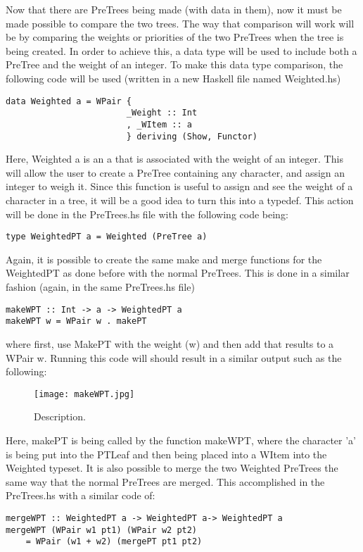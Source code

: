 \documentclass{article}
\begin{document}
Now that there are PreTrees being made (with data in them), now it must be made possible to compare the two trees.
The way that comparison will work will be by comparing the weights or priorities of the two PreTrees when the tree is being created.
In order to achieve this, a data type will be used to include both a PreTree and the weight of an integer.
To make this data type comparison, the following code will be used (written in a new Haskell file named Weighted.hs)
\begin{lstlisting}
data Weighted a = WPair {
                        _Weight :: Int
                        , _WItem :: a
                        } deriving (Show, Functor)
\end{lstlisting}
Here, Weighted a is an a that is associated with the weight of an integer.
This will allow the user to create a PreTree containing any character, and assign an integer to weigh it.
Since this function is useful to assign and see the weight of a character in a tree, it will be a good idea to turn this into a typedef.
This action will be done in the PreTrees.hs file with the following code being:
\begin{lstlisting}
type WeightedPT a = Weighted (PreTree a)
\end{lstlisting}
Again, it is possible to create the same make and merge functions for the WeightedPT as done before with the normal PreTrees.
This is done in a similar fashion (again, in the same PreTrees.hs file)
\begin{lstlisting}
makeWPT :: Int -> a -> WeightedPT a
makeWPT w = WPair w . makePT
\end{lstlisting}
where first, use MakePT with the weight (w) and then add that results to a WPair w.
Running this code will should result in a similar output such as the following:
\begin{figure}[htp]
    \centering
    \texttt{[image: makeWPT.jpg]}
    \caption{Description.}
    \label{fig: Haskell in Command Line}
\end{figure}

Here, makePT is being called by the function makeWPT, where the character 'a' is being put into the PTLeaf and then being placed into a WItem into the Weighted typeset.
It is also possible to merge the two Weighted PreTrees the same way that the normal PreTrees are merged.
This accomplished in the PreTrees.hs with a similar code of:

\begin{lstlisting}
mergeWPT :: WeightedPT a -> WeightedPT a-> WeightedPT a
mergeWPT (WPair w1 pt1) (WPair w2 pt2)
    = WPair (w1 + w2) (mergePT pt1 pt2)
\end{lstlisting}
\end{document}
